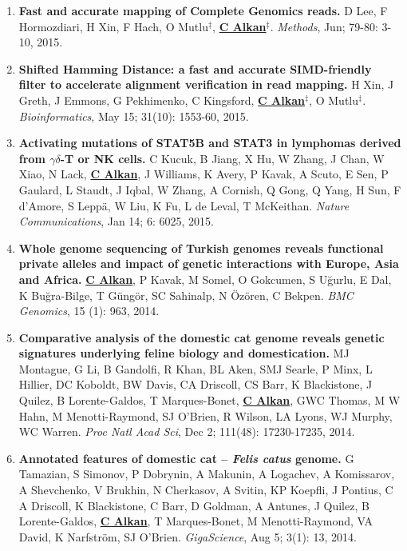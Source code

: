 \begin{enumerate}
  \item        
  {\bf Fast and accurate mapping of Complete Genomics reads.}
  D Lee, F Hormozdiari, H Xin, F Hach, O Mutlu$^\ddag$,  {\bf {\underline {C Alkan}}}$^\ddag$.
  {\em Methods}, Jun; 79-80: 3-10, 2015. 

  \item        
  {\bf Shifted Hamming Distance: a fast and accurate SIMD-friendly filter to accelerate alignment verification in read mapping.} H Xin, J Greth, J Emmons, 
G Pekhimenko, C Kingsford, {\bf {\underline{C Alkan}}}$^\ddag$,  O Mutlu$^\ddag$. {\em Bioinformatics},  May 15; 31(10): 1553-60, 2015.



  \item        
  {\bf Activating mutations of STAT5B and STAT3 in lymphomas derived from $\gamma\delta$-T or NK cells.}
   C Kucuk, B Jiang, X Hu, W Zhang, J Chan, W Xiao, N Lack,   {\bf {\underline {C Alkan}}},  J Williams, K Avery, P Kavak, A Scuto, E Sen,  P Gaulard, L Staudt, J Iqbal,  W Zhang,  A Cornish, Q Gong, Q  Yang, H Sun, F d'Amore, S Leppä, W Liu, K Fu, L de Leval, T McKeithan.
 {\em Nature Communications}, Jan 14; 6: 6025, 2015.


\clearpage
  \item        
  {\bf Whole genome sequencing of Turkish genomes reveals functional private alleles and impact of genetic interactions with Europe, Asia and Africa.}
  {\bf {\underline {C Alkan}}}, P Kavak, M Somel, O Gokcumen, S Uğurlu, E Dal, K Buğra-Bilge,  T Güngör, SC Sahinalp, N Özören, C Bekpen.
  {\em BMC Genomics}, 15 (1): 963, 2014.


  \item        
  {\bf Comparative analysis of the domestic cat genome reveals genetic signatures underlying feline biology and domestication.}
  MJ Montague, G Li, B Gandolfi, R Khan, BL Aken, SMJ Searle, P Minx, L Hillier, DC Koboldt, BW Davis, CA Driscoll, 
  CS Barr, K Blackistone, J Quilez, B Lorente-Galdos, T Marques-Bonet, {\bf {\underline {C Alkan}}}, GWC Thomas, M W Hahn, M Menotti-Raymond, 
  SJ O’Brien, R Wilson, LA Lyons, WJ Murphy, WC Warren. {\em Proc Natl Acad Sci}, Dec 2; 111(48): 17230-17235, 2014.

  \item        
  {\bf Annotated features of domestic cat – \textit{Felis catus} genome.}
  G Tamazian, S Simonov, P Dobrynin, A Makunin, A Logachev, 
  A Komissarov, A Shevchenko, V Brukhin, N Cherkasov, A Svitin,
  KP Koepfli, J Pontius, C A Driscoll, K Blackistone, C Barr, 
  D Goldman, A Antunes, J Quilez, B Lorente-Galdos,  {\bf {\underline {C Alkan}}},
  T Marques-Bonet, M Menotti-Raymond, VA David, K Narfström, SJ O’Brien.
  {\em GigaScience}, Aug 5;  3(1): 13, 2014.
       

\end{enumerate}

